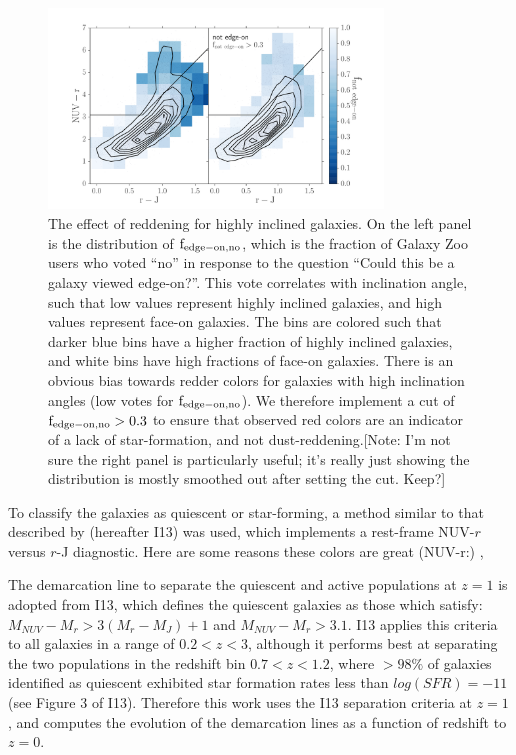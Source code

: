\documentclass[useAMS,usenatbib]{mn2e}
\begin{document}
\begin{figure}
\centering
\includegraphics[width=3.5in,trim={1cm 0cm 1cm 1cm},clip]{figures/edgeon_colorcolor.pdf}
\caption{The effect of reddening for highly inclined galaxies. On the left panel is the distribution of $\rm f_{edge-on,no}$, which is the fraction of Galaxy Zoo users who voted ``no'' in response to the question ``Could this be a galaxy viewed edge-on?''. This vote correlates with inclination angle, such that low values represent highly inclined galaxies, and high values represent face-on galaxies. The bins are colored such that darker blue bins have a higher fraction of highly inclined galaxies, and white bins have high fractions of face-on galaxies. There is an obvious bias towards redder colors for galaxies with high inclination angles (low votes for $\rm f_{edge-on,no}$). We therefore implement a cut of $\rm f_{edge-on,no}>0.3$ to ensure that observed red colors are an indicator of a lack of star-formation, and not dust-reddening.[Note: I'm not sure the right panel is particularly useful; it's really just showing the distribution is mostly smoothed out after setting the cut. Keep?] }
\label{fig:edgeon}
\end{figure}
To classify the galaxies as quiescent or star-forming, a method similar to that described by \citet{Ilbert2013} (hereafter I13) was used, which implements a rest-frame NUV-$r$ versus $r$-J diagnostic. Here are some reasons these colors are great (NUV-r:) \citep{Arnouts2007a,Salim2005a,Wyder2007},\citep{Martin2007}

The demarcation line to separate the quiescent and active populations at $z=1$ is adopted from I13, which defines the quiescent galaxies as those which satisfy: $M_{NUV}-M_{r} > 3(M_{r}-M_{J})+1$ and $M_{NUV}-M_{r} > 3.1$. I13 applies this criteria to all galaxies in a range of $0.2<z<3$, although it performs best at separating the two populations in the redshift bin $0.7<z<1.2$, where $>98\%$ of galaxies identified as quiescent exhibited star formation rates less than $log(SFR) = -11$ (see Figure 3 of I13). Therefore this work uses the I13 separation criteria at $z=1$, and computes the evolution of the demarcation lines as a function of redshift to $z=0$. 
\end{document}
